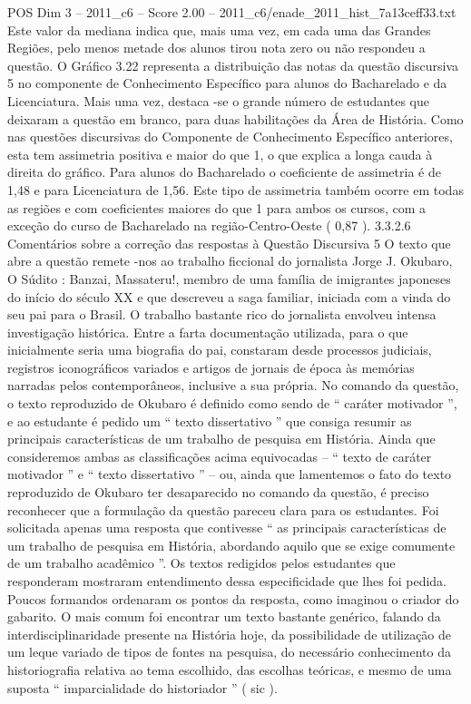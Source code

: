\begin{textsample}{POS Dim 3 – 2011\_c6 – Score 2.00 – 2011\_c6/enade\_2011\_hist\_7a13ceff33.txt}
Este valor da mediana indica que, mais uma vez, em cada uma das Grandes Regiões, pelo menos metade dos alunos tirou nota zero ou não respondeu a questão.
O Gráfico 3.22 representa a distribuição das notas da questão discursiva 5 no componente de Conhecimento Específico para alunos do Bacharelado e da Licenciatura.
Mais uma vez, destaca -se o grande número de estudantes que deixaram a questão em branco, para duas habilitações da Área de História.
Como nas questões discursivas do Componente de Conhecimento Específico anteriores, esta tem assimetria positiva e maior do que 1, o que explica a longa cauda à direita do gráfico.
Para alunos do Bacharelado o coeficiente de assimetria é de 1,48 e para Licenciatura de 1,56.
Este tipo de assimetria também ocorre em todas as regiões e com coeficientes maiores do que 1 para ambos os cursos, com a exceção do curso de Bacharelado na região-Centro-Oeste ( 0,87 ). 3.3.2.6 Comentários sobre a correção das respostas à Questão Discursiva 5 O texto que abre a questão remete -nos ao trabalho ficcional do jornalista Jorge J.
Okubaro, O Súdito : Banzai, Massateru!, membro de uma família de imigrantes japoneses do início do século XX e que descreveu a saga familiar, iniciada com a vinda do seu pai para o Brasil.
O trabalho bastante rico do jornalista envolveu intensa investigação histórica.
Entre a farta documentação utilizada, para o que inicialmente seria uma biografia do pai, constaram desde processos judiciais, registros iconográficos variados e artigos de jornais de época às memórias narradas pelos contemporâneos, inclusive a sua própria.
No comando da questão, o texto reproduzido de Okubaro é definido como sendo de “ caráter motivador ”, e ao estudante é pedido um “ texto dissertativo ” que consiga resumir as principais características de um trabalho de pesquisa em História.
Ainda que consideremos ambas as classificações acima equivocadas – “ texto de caráter motivador ” e “ texto dissertativo ” – ou, ainda que lamentemos o fato do texto reproduzido de Okubaro ter desaparecido no comando da questão, é preciso reconhecer que a formulação da questão pareceu clara para os estudantes.
Foi solicitada apenas uma resposta que contivesse “ as principais características de um trabalho de pesquisa em História, abordando aquilo que se exige comumente de um trabalho acadêmico ”.
Os textos redigidos pelos estudantes que responderam mostraram entendimento dessa especificidade que lhes foi pedida.
Poucos formandos ordenaram os pontos da resposta, como imaginou o criador do gabarito.
O mais comum foi encontrar um texto bastante genérico, falando da interdisciplinaridade presente na História hoje, da possibilidade de utilização de um leque variado de tipos de fontes na pesquisa, do necessário conhecimento da historiografia relativa ao tema escolhido, das escolhas teóricas, e mesmo de uma suposta “ imparcialidade do historiador ” ( sic ).

\end{textsample}
